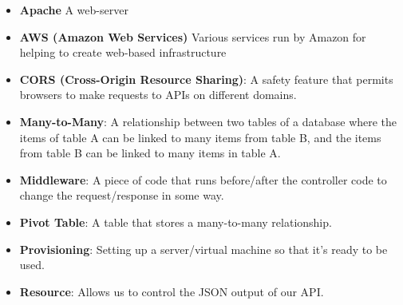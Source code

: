 \begin{itemize}[leftmargin=*]
    \item
        \textbf{Apache}
        A web-server
    \item
        \textbf{AWS (Amazon Web Services)}
        Various services run by Amazon for helping to create web-based infrastructure
    \item
        \textbf{CORS (Cross-Origin Resource Sharing)}:
        A safety feature that permits browsers to make requests to APIs on different domains.
    \item
        \textbf{Many-to-Many}:
        A relationship between two tables of a database where the items of table A can be linked to many items from table B, and the items from table B can be linked to many items in table A.
    \item
        \textbf{Middleware}:
        A piece of code that runs before/after the controller code to change the request/response in some way.
    \item
        \textbf{Pivot Table}:
        A table that stores a many-to-many relationship.
    \item
        \textbf{Provisioning}:
        Setting up a server/virtual machine so that it's ready to be used.
    \item
        \textbf{Resource}:
        Allows us to control the JSON output of our API.
\end{itemize}
